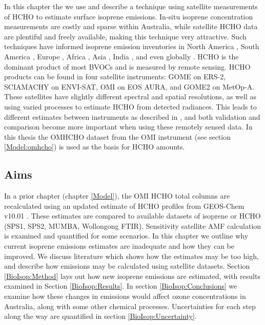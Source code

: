   In this chapter the we use and describe a technique using satellite measurements of HCHO to estimate surface isoprene emissions.
  In-situ isoprene concentration measurements are costly and sparse within Australia, while satellite HCHO data are plentiful and freely available, making this technique very attractive.
  Such techniques have informed isoprene emission inventories in North America \parencite{Abbot2003,Palmer2003,Palmer2006,Millet2006,Millet2008}, South America \parencite{Barkley2013}, Europe \parencite{Dufour2009,Curci2010}, Africa \parencite{Marais2012}, Asia \parencite{Fu2007,Stavrakou2014}, India \parencite{Surl2018}, and even globally \parencite{Shim2005,FortemsCheiney2012,Bauwens2016}.
  HCHO is the dominant product of most BVOCs and is measured by remote sensing.
  HCHO products can be found in four satellite instruments: GOME on ERS-2, SCIAMACHY on ENVI-SAT, OMI on EOS AURA, and GOME2 on MetOp-A.
  These satellites have slightly different spectral and spatial resolutions, as well as using varied processes to estimate HCHO from detected radiances.
  This leads to different estimates between instruments as described in \textcite{Lorente2017}, and both validation and comparison become more important when using these remotely sensed data.
  In this thesis the OMHCHO dataset from the OMI instrument (see section \ref{Model:omhcho}) is used as the basis for HCHO amounts.
  
  
  \subsection{Aims}
    
    In a prior chapter (chapter \ref{Model}), the OMI HCHO total columns are recalculated using an updated estimate of HCHO profiles from GEOS-Chem v10.01 .
    These estimates are compared to available datasets of isoprene or HCHO (SPS1, SPS2, MUMBA, Wollongong FTIR). %
    Sensitivity satellite AMF calculation is examined and quantified for some scenarios.
    In this chapter we outline why current isoprene emissions estimates are inadequate and how they can be improved.
    We discuss literature which shows how the estimates may be too high, and describe how emissions may be calculated using satellite datasets.
    Section \ref{BioIsop:Method} lays out how new isoprene emissions are estimated, with results examined in Section \ref{BioIsop:Results}. 
    In section \ref{BioIsop:Conclusions} we examine how these changes in emissions would affect ozone concentrations in Australia, along with some other chemical processes.
    Uncertainties for each step along the way are quantified in section \ref{BioIsop:Uncertainty}.
    
